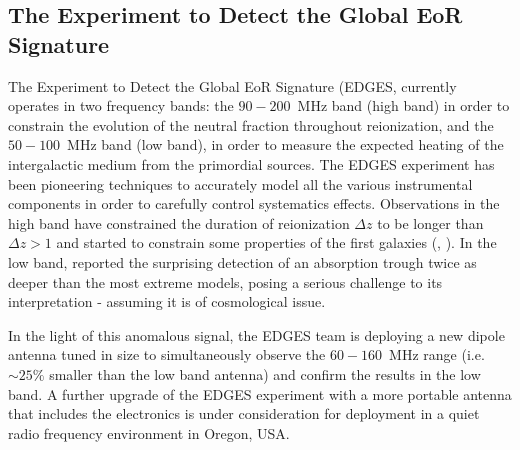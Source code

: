 \subsection{The Experiment to Detect the Global EoR Signature}
The Experiment to Detect the Global EoR Signature (EDGES, \cite{bowman08} currently operates in two frequency bands: the $90-200$~MHz band (high band) in order to constrain the evolution of the neutral fraction throughout reionization, and the $50-100$~MHz band (low band), in order to measure the expected heating of the intergalactic medium from the primordial sources. 
The EDGES experiment has been pioneering techniques to accurately model all the various instrumental components in order to carefully control systematics effects. Observations in the high band have constrained the duration of reionization $\Delta z$ to be longer than $\Delta z >  1$ and started to constrain some properties of the first galaxies (\cite{monsalve17}, \cite{monsalve18}). In the low band, \cite{bowman18} reported the surprising detection of an absorption trough twice as deeper than the most extreme models, posing a serious challenge to its interpretation - assuming it is of cosmological issue. 

In the light of this anomalous signal, the EDGES team is deploying a new dipole antenna tuned in size to simultaneously observe the $60-160$~MHz range (i.e. $\sim 25\%$ smaller than the low band antenna) and confirm the results in the low band. A further upgrade of the EDGES experiment with a more portable antenna that includes the electronics is under consideration for deployment in a quiet radio frequency environment in Oregon, USA.



